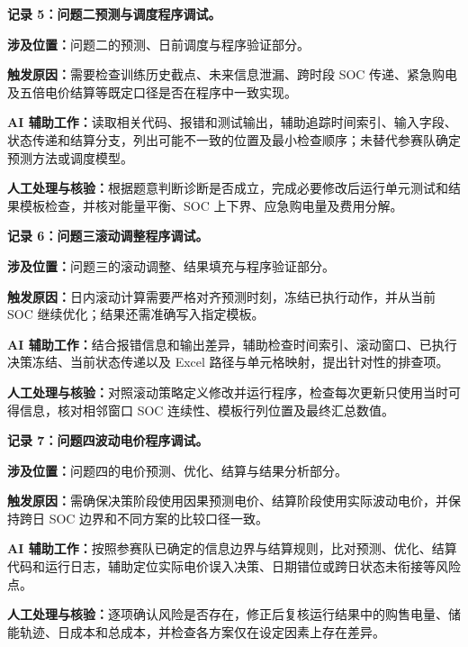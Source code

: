 \documentclass[withoutpreface,bwprint]{cumcmthesis}
\begin{document}
\par\medskip\noindent\textbf{记录 5：问题二预测与调度程序调试。}\par
\par\noindent\textbf{涉及位置：}问题二的预测、日前调度与程序验证部分。
\par\noindent\textbf{触发原因：}需要检查训练历史截点、未来信息泄漏、跨时段 SOC 传递、紧急购电及五倍电价结算等既定口径是否在程序中一致实现。
\par\noindent\textbf{AI 辅助工作：}读取相关代码、报错和测试输出，辅助追踪时间索引、输入字段、状态传递和结算分支，列出可能不一致的位置及最小检查顺序；未替代参赛队确定预测方法或调度模型。
\par\noindent\textbf{人工处理与核验：}根据题意判断诊断是否成立，完成必要修改后运行单元测试和结果模板检查，并核对能量平衡、SOC 上下界、应急购电量及费用分解。

\par\medskip\noindent\textbf{记录 6：问题三滚动调整程序调试。}\par
\par\noindent\textbf{涉及位置：}问题三的滚动调整、结果填充与程序验证部分。
\par\noindent\textbf{触发原因：}日内滚动计算需要严格对齐预测时刻，冻结已执行动作，并从当前 SOC 继续优化；结果还需准确写入指定模板。
\par\noindent\textbf{AI 辅助工作：}结合报错信息和输出差异，辅助检查时间索引、滚动窗口、已执行决策冻结、当前状态传递以及 Excel 路径与单元格映射，提出针对性的排查项。
\par\noindent\textbf{人工处理与核验：}对照滚动策略定义修改并运行程序，检查每次更新只使用当时可得信息，核对相邻窗口 SOC 连续性、模板行列位置及最终汇总数值。

\par\medskip\noindent\textbf{记录 7：问题四波动电价程序调试。}\par
\par\noindent\textbf{涉及位置：}问题四的电价预测、优化、结算与结果分析部分。
\par\noindent\textbf{触发原因：}需确保决策阶段使用因果预测电价、结算阶段使用实际波动电价，并保持跨日 SOC 边界和不同方案的比较口径一致。
\par\noindent\textbf{AI 辅助工作：}按照参赛队已确定的信息边界与结算规则，比对预测、优化、结算代码和运行日志，辅助定位实际电价误入决策、日期错位或跨日状态未衔接等风险点。
\par\noindent\textbf{人工处理与核验：}逐项确认风险是否存在，修正后复核运行结果中的购售电量、储能轨迹、日成本和总成本，并检查各方案仅在设定因素上存在差异。
\end{document}
